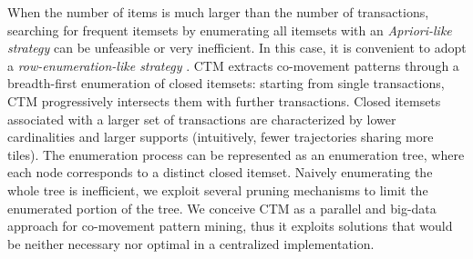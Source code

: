 \documentclass[
]{ceurart}
\newtheorem{theorem}{Theorem}
\newtheorem{example}{Example}
\newtheorem{definition}{Definition}
\begin{document}
When the number of items is much larger than the number of transactions, searching for frequent itemsets by enumerating all itemsets with an \textit{Apriori-like strategy} \citep{DBLP:conf/vldb/AgrawalS94} can be unfeasible or very inefficient.
In this case, it is convenient to adopt a \textit{row-enumeration-like strategy} \citep{DBLP:conf/kdd/PanCTYZ03}. %
%
%
CTM extracts co-movement patterns through a breadth-first enumeration of 
closed itemsets: starting from single transactions, CTM progressively intersects them with further transactions.
Closed itemsets associated with a larger set of transactions are characterized by lower cardinalities and larger supports (intuitively, fewer trajectories sharing more tiles).
The enumeration process can be represented as an enumeration tree, where each node 
corresponds to a distinct closed itemset.
Naively enumerating the whole tree is inefficient, we exploit several pruning mechanisms to limit the enumerated portion of the tree.
We conceive CTM as a parallel and big-data approach for co-movement pattern mining, thus it exploits solutions that would be neither necessary nor optimal in a centralized implementation.
\end{document}
